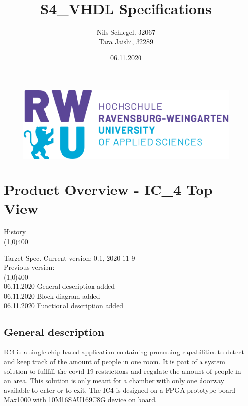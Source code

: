 \documentclass[12pt,a4 paper] {article}
\title{S4\_VHDL Specifications}
\author{Nils Schlegel, 32067 \\ Tara Jaishi, 32289}
\date{06.11.2020}
\begin{document}
	\maketitle

\begin{figure}[h]
	\centering
	\includegraphics[scale=0.4]{../png/hs.png}
	
\end{figure}
\newpage

\section{Product Overview - IC\_4 Top View}

History\\
\line(1,0){400}
\begin{flushleft}
	Target Spec. Current version: 0.1, 2020-11-9 \\
\hspace{2.2cm}	Previous version:-\\
\line(1,0){400}\\	             
\hspace{2.2cm}	06.11.2020 \hfill General description added\\
\hspace{2.2cm}	06.11.2020 \hfill Block diagram added\\
\hspace{2.2cm}	06.11.2020	\hfill Functional description added
\end{flushleft}

\subsection{General description}
IC4 is a single chip based application containing processing capabilities to detect and keep track of the amount of people in one room. It is part of a system solution to fullfill the covid-19-restrictions and regulate the amount of people in an area. This solution is only meant for a chamber with only one doorway available to enter or to exit.\newline
The IC4 is designed on a FPGA prototype-board Max1000 with 10M16SAU169C8G device on board.
\end{document}
